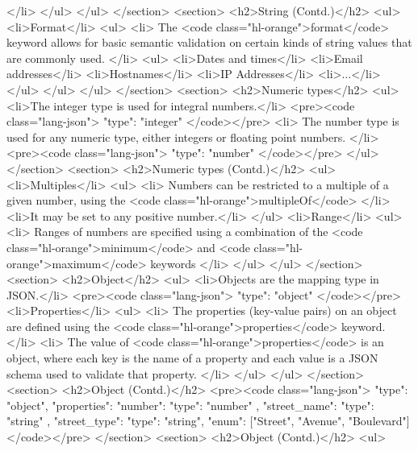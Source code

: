 \documentclass{efd-lecture}
\begin{document}
        </li>
      </ul>
    </ul>
  </section>
  <section>
    <h2>String (Contd.)</h2>
    <ul>
      <li>Format</li>
      <ul>
        <li>
          The <code class="hl-orange">format</code> keyword allows for basic
          semantic validation on certain kinds of string values that are
          commonly used.
        </li>
        <ul>
          <li>Dates and times</li>
          <li>Email addresses</li>
          <li>Hostnames</li>
          <li>IP Addresses</li>
          <li>...</li>
        </ul>
      </ul>
    </ul>
  </section>
  <section>
    <h2>Numeric types</h2>
    <ul>
      <li>The integer type is used for integral numbers.</li>
      <pre><code class="lang-json">
{ "type": "integer" }
    </code></pre>
      <li>
        The number type is used for any numeric type, either integers or
        floating point numbers.
      </li>
      <pre><code class="lang-json">
{ "type": "number" }
    </code></pre>
    </ul>
  </section>
  <section>
    <h2>Numeric types (Contd.)</h2>
    <ul>
      <li>Multiples</li>
      <ul>
        <li>
          Numbers can be restricted to a multiple of a given number, using the
          <code class="hl-orange">multipleOf</code>
        </li>
        <li>It may be set to any positive number.</li>
      </ul>
      <li>Range</li>
      <ul>
        <li>
          Ranges of numbers are specified using a combination of the
          <code class="hl-orange">minimum</code> and
          <code class="hl-orange">maximum</code> keywords
        </li>
      </ul>
    </ul>
  </section>
  <section>
    <h2>Object</h2>
    <ul>
      <li>Objects are the mapping type in JSON.</li>
      <pre><code class="lang-json">
{ "type": "object" }
      </code></pre>
      <li>Properties</li>
      <ul>
        <li>
          The properties (key-value pairs) on an object are defined using the
          <code class="hl-orange">properties</code> keyword.
        </li>
        <li>
          The value of <code class="hl-orange">properties</code> is an object,
          where each key is the name of a property and each value is a JSON
          schema used to validate that property.
        </li>
      </ul>
    </ul>
  </section>
  <section>
    <h2>Object (Contd.)</h2>
    <pre><code class="lang-json">
{
  "type": "object",
  "properties": {
    "number":      { "type": "number" },
    "street_name": { "type": "string" },
    "street_type": { "type": "string",
                     "enum": ["Street", "Avenue", "Boulevard"]
                   }
  }
}
    </code></pre>
  </section>
  <section>
    <h2>Object (Contd.)</h2>
    <ul>
\end{document}
